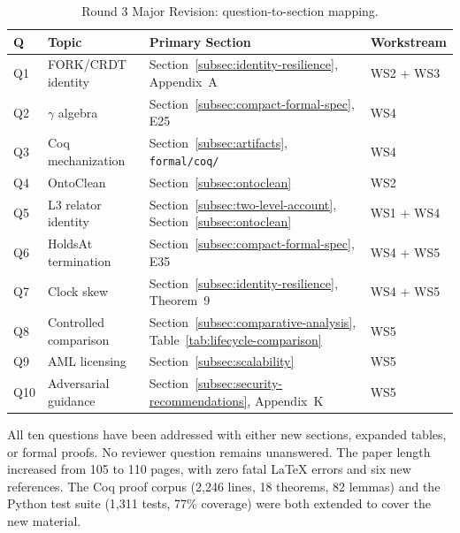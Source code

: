 \begin{table}[htbp]
\centering
\small
\caption{Round 3 Major Revision: question-to-section mapping.}
\label{tab:revision-summary}
\begin{tabularx}{\textwidth}{@{}p{1.5cm}p{3.5cm}XX@{}}
\toprule
\textbf{Q} & \textbf{Topic} & \textbf{Primary Section} & \textbf{Workstream} \\
\midrule
Q1 & FORK/CRDT identity & Section~\ref{subsec:identity-resilience}, Appendix~A & WS2 + WS3 \\
Q2 & $\gamma$ algebra & Section~\ref{subsec:compact-formal-spec}, E25 & WS4 \\
Q3 & Coq mechanization & Section~\ref{subsec:artifacts}, \texttt{formal/coq/} & WS4 \\
Q4 & OntoClean & Section~\ref{subsec:ontoclean} & WS2 \\
Q5 & L3 relator identity & Section~\ref{subsec:two-level-account}, Section~\ref{subsec:ontoclean} & WS1 + WS4 \\
Q6 & HoldsAt termination & Section~\ref{subsec:compact-formal-spec}, E35 & WS4 + WS5 \\
Q7 & Clock skew & Section~\ref{subsec:identity-resilience}, Theorem~9 & WS4 + WS5 \\
Q8 & Controlled comparison & Section~\ref{subsec:comparative-analysis}, Table~\ref{tab:lifecycle-comparison} & WS5 \\
Q9 & AML licensing & Section~\ref{subsec:scalability} & WS5 \\
Q10 & Adversarial guidance & Section~\ref{subsec:security-recommendations}, Appendix~K & WS5 \\
\bottomrule
\end{tabularx}
\end{table}

All ten questions have been addressed with either new sections, expanded tables, or formal proofs. No reviewer question remains unanswered. The paper length increased from 105 to 110 pages, with zero fatal LaTeX errors and six new references. The Coq proof corpus (2,246 lines, 18 theorems, 82 lemmas) and the Python test suite (1,311 tests, 77\% coverage) were both extended to cover the new material.
